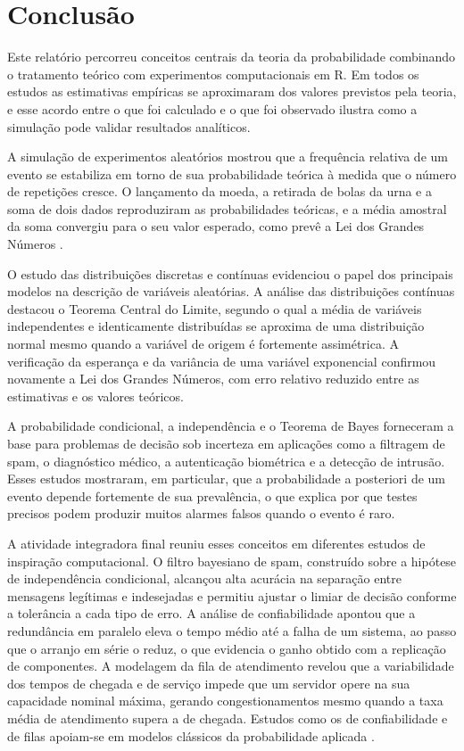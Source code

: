 \section{Conclusão}

Este relatório percorreu conceitos centrais da teoria da probabilidade combinando o
tratamento teórico com experimentos computacionais em R. Em todos os estudos as
estimativas empíricas se aproximaram dos valores previstos pela teoria, e esse
acordo entre o que foi calculado e o que foi observado ilustra como a simulação pode
validar resultados analíticos.

A simulação de experimentos aleatórios mostrou que a frequência relativa de um
evento se estabiliza em torno de sua probabilidade teórica à medida que o número de
repetições cresce. O lançamento da moeda, a retirada de bolas da urna e a soma de
dois dados reproduziram as probabilidades teóricas, e a média amostral da soma
convergiu para o seu valor esperado, como prevê a Lei dos Grandes Números
\cite{ross2010probabilidade}.

O estudo das distribuições discretas e contínuas evidenciou o papel dos principais
modelos na descrição de variáveis aleatórias. A análise das distribuições contínuas
destacou o Teorema Central do Limite, segundo o qual a média de variáveis
independentes e identicamente distribuídas se aproxima de uma distribuição normal
mesmo quando a variável de origem é fortemente assimétrica. A verificação da
esperança e da variância de uma variável exponencial confirmou novamente a Lei dos
Grandes Números, com erro relativo reduzido entre as estimativas e os valores
teóricos.

A probabilidade condicional, a independência e o Teorema de Bayes forneceram a base
para problemas de decisão sob incerteza em aplicações como a filtragem de spam, o
diagnóstico médico, a autenticação biométrica e a detecção de intrusão. Esses
estudos mostraram, em particular, que a probabilidade a posteriori de um evento
depende fortemente de sua prevalência, o que explica por que testes precisos podem
produzir muitos alarmes falsos quando o evento é raro.

A atividade integradora final reuniu esses conceitos em diferentes estudos de
inspiração computacional. O filtro bayesiano de spam, construído sobre a hipótese de
independência condicional, alcançou alta acurácia na separação entre mensagens
legítimas e indesejadas e permitiu ajustar o limiar de decisão conforme a tolerância
a cada tipo de erro. A análise de confiabilidade apontou que a redundância em
paralelo eleva o tempo médio até a falha de um sistema, ao passo que o arranjo em
série o reduz, o que evidencia o ganho obtido com a replicação de componentes. A
modelagem da fila de atendimento revelou que a variabilidade dos tempos de chegada e
de serviço impede que um servidor opere na sua capacidade nominal máxima, gerando
congestionamentos mesmo quando a taxa média de atendimento supera a de chegada.
Estudos como os de confiabilidade e de filas apoiam-se em modelos clássicos da
probabilidade aplicada \cite{ross2024models}.

